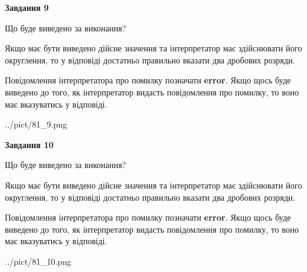 \documentclass[12pt, ukrainian]{article}
\begin{document}
{\begin {Large}
{\begin {center}\textbf{Завдання 9}\end {center}}\par
Що буде виведено за виконання? \par

Якщо має бути виведено дійсне значення та інтерпретатор має здійснювати його округлення, 
то у відповіді достатньо правильно вказати два дробових розряди.

Повідомлення інтерпретатора про помилку позначати \textbf{error}.
Якщо щось буде виведено до того, як інтерпретатор видасть повідомлення про помилку, 
то воно має вказуватись у відповіді. \par

\begin{center}
	{../pict/81_9.png}
\end{center}
\newpage

{\begin {center}\textbf{Завдання 10}\end {center}}\par
Що буде виведено за виконання? \par

Якщо має бути виведено дійсне значення та інтерпретатор має здійснювати його округлення, 
то у відповіді достатньо правильно вказати два дробових розряди.

Повідомлення інтерпретатора про помилку позначати \textbf{error}.
Якщо щось буде виведено до того, як інтерпретатор видасть повідомлення про помилку, 
то воно має вказуватись у відповіді. \par

\begin{center}
	{../pict/81_10.png}
\end{center}
\newpage

\end {Large}}
\end{document}
